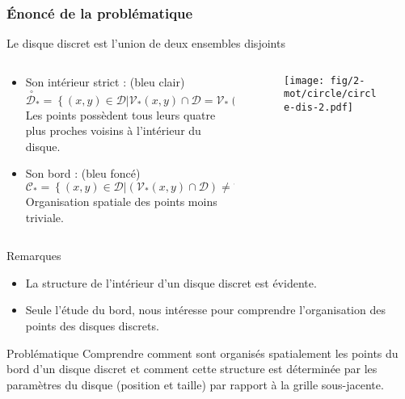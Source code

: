 \begin{frame}
\frametitle{Énoncé de la problématique}
\begin{block}{Le disque discret est l’union de deux ensembles disjoints}
  \begin{columns}[t]
    \begin{column}{0.65\linewidth}
      \begin{itemize}      
        \item Son intérieur strict : (bleu clair)
        $\stackrel{\ \circ}{\mathcal{D}}_{*} =  \left\{ (x,y) \in \mathcal{D} | \mathcal{V}_{*}(x,y) \cap \mathcal{D} = \mathcal{V}_{*}(x,y) \right\}$\\
        Les points possèdent tous leurs quatre plus proches voisins à l’intérieur du disque.
        \item Son bord : (bleu foncé)
        $\mathcal{C}_{*} =  \left\{ (x,y) \in \mathcal{D} | \left( \mathcal{V}_{*}(x,y) \cap \mathcal{D} \right) \neq \mathcal{V}_{*}(x,y) \right\}$\\
        Organisation spatiale des points moins triviale.
      \end{itemize}
    \end{column}
 
    \begin{column}{0.35\linewidth}
      \begin{figure}[H]
        \centering
        \texttt{[image: fig/2-mot/circle/circle-dis-2.pdf]}
       \end{figure}
    \end{column}
  \end{columns}
\end{block}


{
  \begin{exampleblock}{Remarques}
    \begin{itemize}
      \item La structure de l’intérieur d'un disque discret est évidente.
      \item Seule l’étude du bord, nous intéresse pour comprendre l’organisation des points des disques discrets.
    \end{itemize}
  \end{exampleblock} 
}
{
  \begin{alertblock}{Problématique}
    Comprendre comment sont organisés spatialement les points du bord d’un disque discret et comment cette structure est déterminée par les paramètres du disque (position et taille) par rapport à la grille sous-jacente.
  \end{alertblock}

}
\end{frame}

